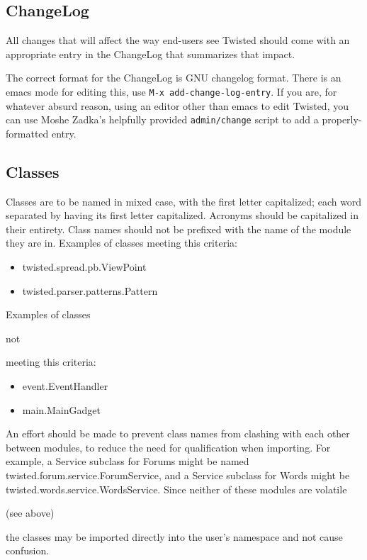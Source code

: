 \subsection{ChangeLog}


All changes that will affect the way end-users see Twisted should come     with an appropriate entry in the ChangeLog that summarizes that impact.

The correct format for the ChangeLog is GNU changelog format.  There is     an emacs mode for editing this, use \texttt{M-x add-change-log-entry}.     If you are, for whatever absurd reason, using an editor other than emacs      to edit Twisted, you can use Moshe Zadka's helpfully provided     \texttt{admin/change} script to add a properly-formatted entry.

\subsection{Classes}


Classes are to be named in mixed case, with the first letter     capitalized; each word separated by having its first letter     capitalized. Acronyms should be capitalized in their entirety.     Class names should not be prefixed with the name of the module they are     in. Examples of classes meeting this criteria:\begin{itemize}
\item twisted.spread.pb.ViewPoint
\item twisted.parser.patterns.Pattern
\end{itemize}


Examples of classes \begin{em}not\end{em} meeting this criteria:\begin{itemize}
\item event.EventHandler
\item main.MainGadget
\end{itemize}


An effort should be made to prevent class names from clashing     with each other between modules, to reduce the need for     qualification when importing. For example, a Service subclass     for Forums might be named twisted.forum.service.ForumService,     and a Service subclass for Words might be     twisted.words.service.WordsService. Since neither of these     modules are volatile \begin{em}(see above)\end{em} the classes may be     imported directly into the user's namespace and not cause     confusion.

